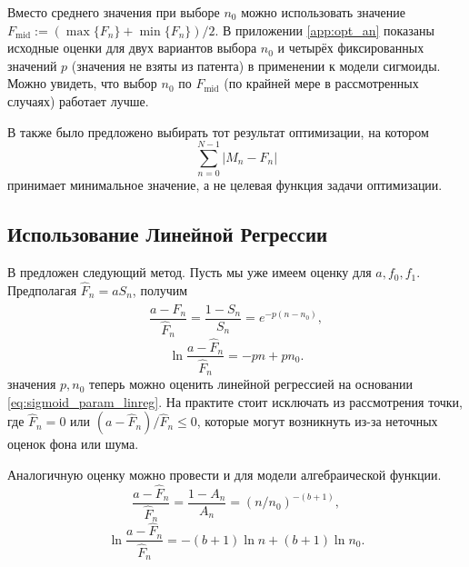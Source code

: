 Вместо среднего значения при выборе $n_0$ можно использовать значение
$F_{\text{mid}}:=(\max\{F_{n}\}+\min\{F_{n}\})/2$. В приложении
\ref{app:opt_an} показаны исходные оценки для двух вариантов выбора $n_0$ и
четырёх фиксированных значений $p$ (значения не взяты из патента) в применении
к модели сигмоиды. Можно увидеть, что выбор $n_0$ по $F_{\text{mid}}$ (по
крайней мере в рассмотренных случаях) работает лучше.

В \cite{kurnikPCRElbowDetermination2011} также было предложено выбирать тот
результат оптимизации, на котором
\[
  \sum_{n=0}^{N-1}|M_{n}-F_{n}|
\]
принимает минимальное значение, а не целевая функция задачи оптимизации.

\subsection{Использование Линейной Регрессии}\label{ssec:linreg_improve}

В \cite{liuProgressCurveAnalysis2011,goudarRobustParameterEstimation2009}
предложен следующий метод. Пусть мы уже имеем оценку для $a,f_0,f_1$.
Предполагая $\hat F_{n}=aS_{n}$, получим
\[
  \frac{a-\hat F_{n}}{\hat F_{n}}=\frac{1-S_{n}}{S_{n}}=e^{-p(n-n_0)},
\]
\begin{equation}\label{eq:sigmoid_param_linreg}
  \ln\frac{a-\hat F_{n}}{\hat F_{n}}=-pn + pn_0.
\end{equation}
значения $p,n_0$ теперь можно оценить линейной регрессией на основании
\eqref{eq:sigmoid_param_linreg}. На практите стоит исключать из рассмотрения
точки, где $\hat F_{n}=0$ или $(a-\hat F_{n})/\hat F_{n}\leq 0$, которые могут
возникнуть из-за неточных оценок фона или шума.

Аналогичную оценку можно провести и для модели алгебраической функции.
\[
  \frac{a-\hat F_{n}}{\hat F_{n}}=\frac{1-A_{n}}{A_{n}}=(n/n_0)^{-(b+1)},
\]
\[
  \ln\frac{a-\hat F_{n}}{\hat F_{n}}=-(b+1)\ln n+(b+1)\ln n_0.
\]

